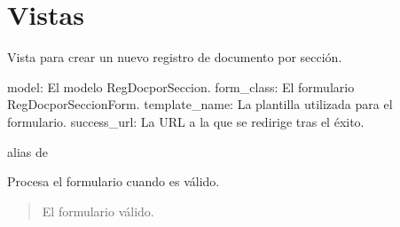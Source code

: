 \documentclass[letterpaper,10pt,spanish]{sphinxmanual}
\begin{document}
\section{Vistas}
\label{\detokenize{oplectura:vistas}}

\begin{fulllineitems}

\pysigstartsignatures
{}
\pysigstopsignatures
\sphinxAtStartPar
Vista para crear un nuevo registro de documento por sección.
\begin{description}
\sphinxAtStartPar
model: El modelo RegDocporSeccion.
form\_class: El formulario RegDocporSeccionForm.
template\_name: La plantilla utilizada para el formulario.
success\_url: La URL a la que se redirige tras el éxito.

\end{description}


\begin{fulllineitems}

\pysigstartsignatures
{}
\pysigstopsignatures
\end{fulllineitems}



\begin{fulllineitems}

\pysigstartsignatures
{}
\pysigstopsignatures
\sphinxAtStartPar
alias de 

\end{fulllineitems}



\begin{fulllineitems}

\pysigstartsignatures
{}
\pysigstopsignatures
\sphinxAtStartPar
Procesa el formulario cuando es válido.
\begin{quote}\begin{description}
\sphinxAtStartPar
{} \textendash{} El formulario válido.


\end{description}
\end{quote}
\end{fulllineitems}
\end{fulllineitems}
\end{document}
